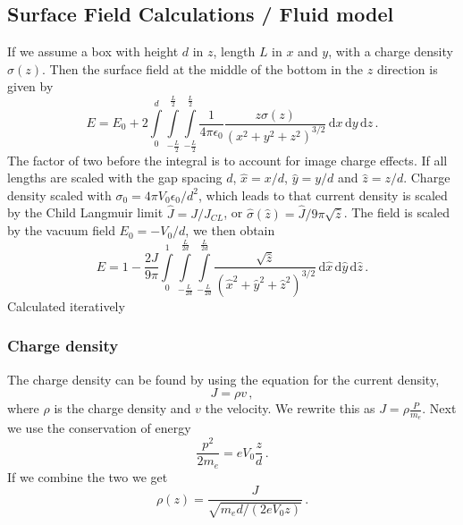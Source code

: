 \documentclass[a4paper,10pt]{article}
\numberwithin{equation}{section}
\newcommand{\ud}{\mathrm{d}}
\begin{document}
\subsection{Surface Field Calculations / Fluid model}
If we assume a box with height \(d\) in \(z\), length \(L\) in \(x\) and \(y\), with a charge density \(\sigma(z)\).
Then the surface field at the middle of the bottom in the \(z\) direction is given by
\begin{equation}
  E = E_0 + 2\int\limits_0^d\!\! \int\limits_{-\frac{L}{2}}^{\frac{L}{2}}\!\! \int\limits_{-\frac{L}{2}}^{\frac{L}{2}}\!\!
    \frac{1}{4\pi\epsilon_0} \frac{z \sigma(z)}{(x^2 + y^2 + z^2)^{3/2}}\, \ud x\, \ud y\, \ud z\, .
\end{equation}
The factor of two before the integral is to account for image charge effects.
If all lengths are scaled with the gap spacing \(d\), \(\hat{x} = x/d\), \(\hat{y} = y/d\) and \(\hat{z} = z/d\).
Charge density scaled with \(\sigma_0 = 4\pi V_0 \epsilon_0/d^2\), which leads to that current density is scaled
by the Child Langmuir limit \(\hat{J} = J/J_{CL}\), or \(\hat{\sigma}(\hat{z}) = \hat{J}/9\pi\sqrt{\hat{z}}\).
The field is scaled by the vacuum field \(E_0 = -V_0/d\), we then obtain
\begin{equation}
  E = 1 - \frac{2J}{9\pi}\int\limits_0^1\!\! \int\limits_{-\frac{L}{2d}}^{\frac{L}{2d}}\!\! \int\limits_{-\frac{L}{2d}}^{\frac{L}{2d}}\!\!
    \frac{\sqrt{\hat{z}}}{(\hat{x}^2 + \hat{y}^2 + \hat{z}^2)^{3/2}}\, \ud \hat{x}\, \ud \hat{y}\, \ud \hat{z}\, .
\end{equation}
Calculated iteratively

\subsubsection{Charge density}
The charge density can be found by using the equation for the current density,
\begin{equation}
 J = \rho v\, ,
\end{equation}
where \(\rho\) is the charge density and \(v\) the velocity. We rewrite this as
\(J = \rho \frac{P}{m_e}\). Next we use the conservation of energy
\begin{equation}
 \frac{p^2}{2m_e} = eV_0\frac{z}{d}\, .
\end{equation}
If we combine the two we get
\begin{equation}
 \rho(z) = \frac{J}{\sqrt{m_e d / (2eV_0 z)}}\, .
\end{equation}
\end{document}
